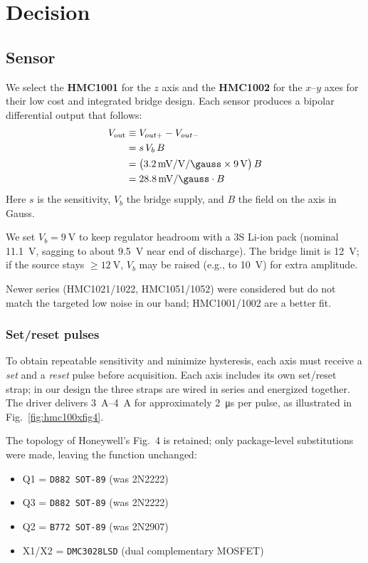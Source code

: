 \documentclass[11pt]{article}
\begin{document}
\section{Decision}

\subsection{Sensor}
We select the \textbf{HMC1001} for the $z$ axis and the \textbf{HMC1002} for the
$x$--$y$ axes for their low cost and integrated bridge design. Each sensor
produces a bipolar differential output that follows:
\begin{align}
  V_{\text{out}} &\equiv V_{out+}-V_{out-} \\
                 &= s\,V_b\,B \\
                 &= \bigl(\SI{3.2}{\milli\volt\per\volt\per\gauss}
                     \times \SI{9}{\volt}\bigr)\,B \\
                 &= \SI{28.8}{\milli\volt\per\gauss}\cdot B
\end{align}
Here $s$ is the sensitivity, $V_b$ the bridge supply, and $B$ the field on the
axis in Gauss.

We set $V_b=\SI{9}{\volt}$ to keep regulator headroom with a 3S Li-ion pack
(nominal \SI{11.1}{\volt}, sagging to about \SI{9.5}{\volt} near end of
discharge). The bridge limit is \SI{12}{\volt}; if the source stays
$\ge\SI{12}{\volt}$, $V_b$ may be raised (e.g., to \SI{10}{\volt}) for extra
amplitude.

Newer series (HMC1021/1022, HMC1051/1052) were considered but do not match the
targeted low noise in our band; HMC1001/1002 are a better fit.


\subsubsection{Set/reset pulses}
To obtain repeatable sensitivity and minimize hysteresis, each axis must 
receive a \emph{set} and a \emph{reset} pulse before acquisition. Each 
axis includes its own set/reset strap; in our design the three straps 
are wired in series and energized together. The driver delivers 
\SIrange{3}{4}{\ampere} for approximately \SI{2}{\micro\second} per 
pulse, as illustrated in Fig.~\ref{fig:hmc100xfig4}.

The topology of Honeywell’s Fig.~4 is retained; only package-level 
substitutions were made, leaving the function unchanged:
\begin{itemize}
  \item Q1 = \texttt{D882 SOT-89} (was 2N2222)
  \item Q3 = \texttt{D882 SOT-89} (was 2N2222)
  \item Q2 = \texttt{B772 SOT-89} (was 2N2907)
  \item X1/X2 = \texttt{DMC3028LSD} (dual complementary MOSFET)
\end{itemize}
\end{document}
